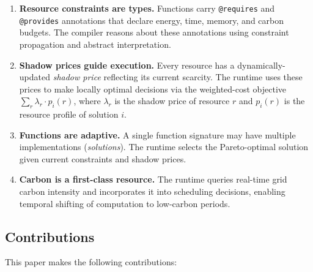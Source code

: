 \documentclass[11pt,a4paper]{article}
\begin{document}
\begin{enumerate}[label=(\roman*)]
  \item \textbf{Resource constraints are types.}  Functions carry
    \texttt{@requires} and \texttt{@provides} annotations that declare energy,
    time, memory, and carbon budgets.  The compiler reasons about these
    annotations using constraint propagation and abstract interpretation.

  \item \textbf{Shadow prices guide execution.}  Every resource has a
    dynamically-updated \emph{shadow price} reflecting its current scarcity.
    The runtime uses these prices to make locally optimal decisions via the
    weighted-cost objective $\sum_r \lambda_r \cdot p_i(r)$, where $\lambda_r$
    is the shadow price of resource $r$ and $p_i(r)$ is the resource profile
    of solution $i$.

  \item \textbf{Functions are adaptive.}  A single function signature may have
    multiple implementations (\emph{solutions}).  The runtime selects the
    Pareto-optimal solution given current constraints and shadow prices.

  \item \textbf{Carbon is a first-class resource.}  The runtime queries
    real-time grid carbon intensity and incorporates it into scheduling
    decisions, enabling temporal shifting of computation to low-carbon periods.
\end{enumerate}

\subsection{Contributions}

This paper makes the following contributions:
\end{document}
